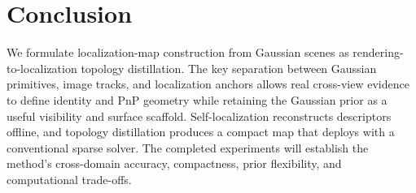 \section{Conclusion}

We formulate localization-map construction from Gaussian scenes as
rendering-to-localization topology distillation. The key separation between
Gaussian primitives, image tracks, and localization anchors allows real
cross-view evidence to define identity and PnP geometry while retaining the
Gaussian prior as a useful visibility and surface scaffold. Self-localization
reconstructs descriptors offline, and topology distillation produces a compact
map that deploys with a conventional sparse solver. The completed experiments
will establish the method's cross-domain accuracy, compactness, prior
flexibility, and computational trade-offs.
